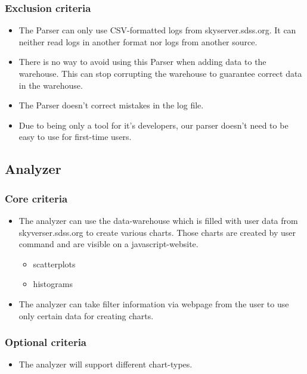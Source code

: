 \subsubsection{Exclusion criteria}
\begin{itemize}
\item The Parser can only use CSV-formatted logs from skyserver.sdss.org. 
It can neither read logs in another format nor logs
from another source.
\item There is no way to avoid using this Parser when adding data to the warehouse. 
This can stop corrupting the warehouse to guarantee correct data in the warehouse.
\item The Parser doesn't correct mistakes in the log file.
\item Due to being only a tool for it's developers, our parser doesn't need to be easy to use for first-time users.
\end{itemize}



\subsection{Analyzer}

\subsubsection{Core criteria}
\begin{itemize}
\item The analyzer can use the data-warehouse which is filled with user data  
from skyverser.sdss.org to create various charts. 
Those charts are created by user command and are visible on a javascript-website.
\begin{itemize}
\item scatterplots
\item histograms
\end{itemize}
\item The analyzer can take filter information via webpage from the user to use only certain data for creating charts.
\end{itemize}

\subsubsection{Optional criteria}
\begin{itemize}
\item The analyzer will support different chart-types.
\end{itemize}

